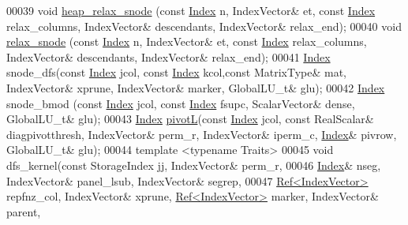 \begin{DoxyCode}
00039      \textcolor{keywordtype}{void} \hyperlink{group___sparse_l_u___module_a88952ce33c968374b149e31d0539178d}{heap\_relax\_snode} (\textcolor{keyword}{const} \hyperlink{namespace_eigen_a62e77e0933482dafde8fe197d9a2cfde}{Index} n, IndexVector& et, \textcolor{keyword}{const} 
      \hyperlink{namespace_eigen_a62e77e0933482dafde8fe197d9a2cfde}{Index} relax\_columns, IndexVector& descendants, IndexVector& relax\_end); 
00040      \textcolor{keywordtype}{void} \hyperlink{group___sparse_l_u___module_a33672df380f94e774c5a6919d3474af4}{relax\_snode} (\textcolor{keyword}{const} \hyperlink{namespace_eigen_a62e77e0933482dafde8fe197d9a2cfde}{Index} n, IndexVector& et, \textcolor{keyword}{const} 
      \hyperlink{namespace_eigen_a62e77e0933482dafde8fe197d9a2cfde}{Index} relax\_columns, IndexVector& descendants, IndexVector& relax\_end); 
00041      \hyperlink{namespace_eigen_a62e77e0933482dafde8fe197d9a2cfde}{Index} snode\_dfs(\textcolor{keyword}{const} \hyperlink{namespace_eigen_a62e77e0933482dafde8fe197d9a2cfde}{Index} jcol, \textcolor{keyword}{const} \hyperlink{namespace_eigen_a62e77e0933482dafde8fe197d9a2cfde}{Index} kcol,\textcolor{keyword}{const} MatrixType& mat,  IndexVector&
       xprune, IndexVector& marker, GlobalLU\_t& glu); 
00042      \hyperlink{namespace_eigen_a62e77e0933482dafde8fe197d9a2cfde}{Index} snode\_bmod (\textcolor{keyword}{const} \hyperlink{namespace_eigen_a62e77e0933482dafde8fe197d9a2cfde}{Index} jcol, \textcolor{keyword}{const} \hyperlink{namespace_eigen_a62e77e0933482dafde8fe197d9a2cfde}{Index} fsupc, ScalarVector& dense, GlobalLU\_t&
       glu);
00043      \hyperlink{namespace_eigen_a62e77e0933482dafde8fe197d9a2cfde}{Index} \hyperlink{group___sparse_l_u___module_ab5f56947465b829f8d523575724c3ac6}{pivotL}(\textcolor{keyword}{const} \hyperlink{namespace_eigen_a62e77e0933482dafde8fe197d9a2cfde}{Index} jcol, \textcolor{keyword}{const} RealScalar& diagpivotthresh, IndexVector& perm\_r,
       IndexVector& iperm\_c, \hyperlink{namespace_eigen_a62e77e0933482dafde8fe197d9a2cfde}{Index}& pivrow, GlobalLU\_t& glu);
00044      \textcolor{keyword}{template} <\textcolor{keyword}{typename} Traits>
00045      \textcolor{keywordtype}{void} dfs\_kernel(\textcolor{keyword}{const} StorageIndex jj, IndexVector& perm\_r,
00046                     \hyperlink{namespace_eigen_a62e77e0933482dafde8fe197d9a2cfde}{Index}& nseg, IndexVector& panel\_lsub, IndexVector& segrep,
00047                     \hyperlink{group___core___module_class_eigen_1_1_ref}{Ref<IndexVector>} repfnz\_col, IndexVector& xprune, 
      \hyperlink{group___core___module_class_eigen_1_1_ref}{Ref<IndexVector>} marker, IndexVector& parent,

\end{DoxyCode}
